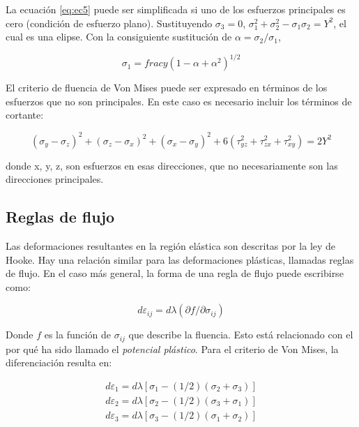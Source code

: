 La ecuación \ref{eq:ec5} puede ser simplificada si uno de los esfuerzos principales es cero (condición de esfuerzo plano). 
Sustituyendo $\sigma_3 = 0$, $\sigma_1^2 + \sigma_2^2 - \sigma_1 \sigma_2 = Y^2$, el cual es una elipse. Con la 
consiguiente sustitución de $\alpha = \sigma_2/\sigma_1$,

\begin{equation}
\sigma_1 = frac{y}{(1-\alpha+\alpha^2)^{1/2}}
\end{equation}

El criterio de fluencia de Von Mises puede ser expresado en términos de los esfuerzos que no son principales. 
En este caso es necesario incluir los términos de cortante:

\begin{equation}
(\sigma_y - \sigma_z)^2 + (\sigma_z - \sigma_x)^2 + (\sigma_x - \sigma_y)^2 + 6 (\tau_{yz}^2 + \tau_{zx}^2 + \tau_{xy}^2) = 2Y^2
\end{equation}

donde x, y, z, son esfuerzos en esas direcciones, que no necesariamente son las direcciones principales.


\subsection{Reglas de flujo}

Las deformaciones resultantes en la región elástica son descritas por la ley de Hooke. 
Hay una relación similar para las deformaciones plásticas, llamadas reglas de flujo. 
En el caso más general, la forma de una regla de flujo puede escribirse como: ~\cite{hosford2007}

\begin{equation}
d\varepsilon_{ij} = d\lambda (\partial f / \partial \sigma_{ij})
\end{equation}

Donde $f$ es la función de $\sigma_{ij}$ que describe la fluencia. Esto está relacionado 
con el por qué ha sido llamado el \textit{potencial plástico}. Para el criterio de 
Von Mises, la diferenciación resulta en: ~\cite{hosford2007}

\begin{align}
d\varepsilon_1 = d\lambda \left[ \sigma_1 - (1/2) (\sigma_2 + \sigma_3) \right] \\
d\varepsilon_2 = d\lambda \left[ \sigma_2 - (1/2) (\sigma_3 + \sigma_1) \right] \\
d\varepsilon_3 = d\lambda \left[ \sigma_3 - (1/2) (\sigma_1 + \sigma_2) \right]
\end{align}

